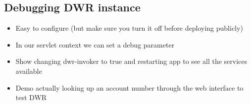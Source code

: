 \begin{ifhtml}
\begin{s5slide}
        \section{Debugging DWR instance}
            \begin{itemize}
                \item Easy to configure (but make sure you turn it off before deploying publicly)
                \item In our servlet context we can set a debug parameter
            \end{itemize}
            \begin{s5notes}
                \begin{itemize}
                    \item Show changing dwr-invoker to true and restarting app to see all the services available
                    \item Demo actually looking up an account number through the web interface to test DWR
                \end{itemize}
            \end{s5notes}
    \end{s5slide}
\end{ifhtml}